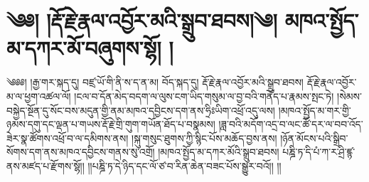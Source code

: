 \setcounter{footnote}{0} 
\chapter{༄༅། །རྡོ་རྗེ་རྣལ་འབྱོར་མའི་སྒྲུབ་ཐབས།༄། མཁའ་སྤྱོད་མ་དཀར་མོ་བཞུགས་སྷོ། ། }༄༅༅། །རྒྱ་གར་སྐད་དུ། བཛྲ་ཡོ་གི་ནི་ས་ད་ན་མ། བོད་སྐད་དུ། རྡོ་རྗེ་རྣལ་འབྱོར་མའི་སྒྲུབ་ཐབས། རྡོ་རྗེ་རྣལ་འབྱོར་མ་ལ་ཕྱག་འཚལ་ལོ། །ངལ་བ་དོན་མེད་བདག་ལ་ལུས་ངག་ཡིད་གསུམ་ལ་བྱ་བའི་གནོད་པ་རྣམས་སྤང་ཏེ། །སེམས་བསྐྱེད་སྔོན་དུ་སོང་བས་མདུན་གྱི་ནམ་མཁའ་དབྱིངས་དག་ནས་ཧྲིཿཡིག་འཕྲོ་འདུ་ལས། །མཁའ་སྤྱོད་མ་གར་གྱི་ཉམས་དགུ་དང་ལྡན་པ་གཡས་རྡོ་རྗེ་གྲི་གུག་གཡོན་ཐོད་པ་བསྣམས། །ཟླ་བའི་མདོག་འདྲ་བ་ལང་ཚོ་དར་ལ་བབ་འོད་ཟེར་སྣ་ཚོགས་འཕྲོ་བ་ལ་དམིགས་ནས། །སྐུ་གསུང་ཐུགས་ཀྱི་སྙིང་པོས་མཆོད་བྱས་ནས། །ཉོན་མོངས་པའི་སྒྲིབ་སོགས་དག་ནས་མཁའ་དབྱིངས་གནས་སུ་འགྲོ། །མཁའ་སྤྱོད་མ་དཀར་མོའི་སྒྲུབ་ཐབས། པཎྜི་ཏ་དི་པཾ་ཀ་ར་ཤྲི་ཛྙ་ནས་མཛད་པ་རྫོགས་སྷོ།། །།པཎྜི་ཏ་དེ་ཉིད་དང་ལོ་ཙ་བ་རིན་ཆེན་བཟང་པོས་སྒྱུར་བའོ།། །།